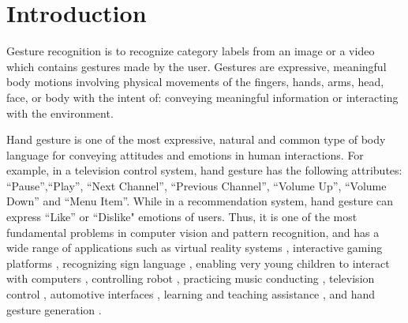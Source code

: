 \documentclass[5p]{elsarticle}
\begin{document}
\section{Introduction}
\label{sec:intro}
Gesture recognition is to recognize category labels from an image or a video which contains gestures made by the user.
Gestures are expressive, meaningful body motions involving physical movements of the fingers, hands, arms, head, face, or body with the intent of:
conveying meaningful information or interacting with the environment.

Hand gesture is one of the most expressive, natural and common type of body language for conveying attitudes and emotions in human interactions.
For example, in a television control system, hand gesture has the following attributes: ``Pause'',``Play'', ``Next Channel'', ``Previous Channel'', ``Volume Up'', ``Volume Down'' and ``Menu Item''. While in a recommendation system, hand gesture can express ``Like'' or ``Dislike" emotions of users.
Thus, it is one of the most fundamental problems in computer vision and pattern recognition, and has a wide range of applications such as
virtual reality systems \cite{wang2015superpixel}, interactive gaming platforms \cite{ren2013robust},
recognizing sign language \cite{hikawa2015novel,marin2014hand,kuznetsova2013real},
enabling very young children to interact with computers \cite{yao2014contour},
controlling robot \cite{prasuhn2014hog,neto2013real}, 
practicing music conducting \cite{schramm2014dynamic},
television control \cite{lian2014automatic,freeman1995television},
automotive interfaces \cite{ohn2014hand,ohn2013power},
learning and teaching assistance \cite{sathayanarayana2014towards,sathyanarayana2013hand}, and hand gesture generation \cite{tang2018gesturegan}.
\end{document}

